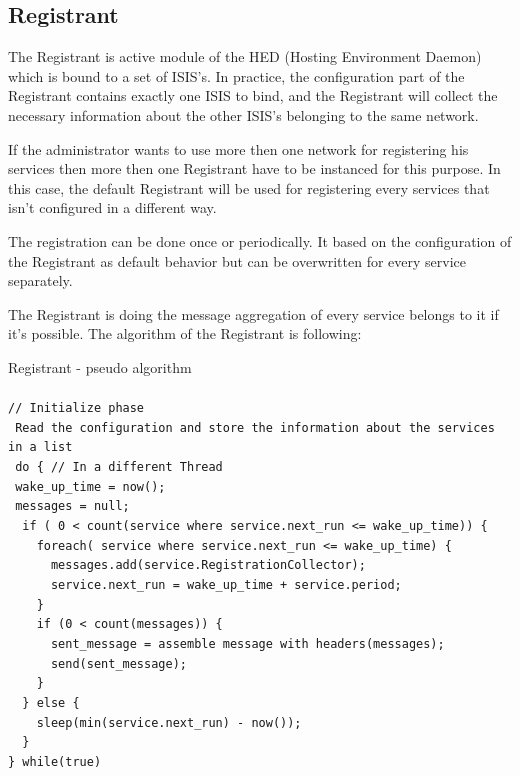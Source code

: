 \documentclass{article}                            %
\begin{document}
\subsection{Registrant}
\label{Registrant}
The Registrant is active module of the HED (Hosting Environment Daemon) which is bound to a set of ISIS's. In practice, the configuration part of the Registrant contains exactly one ISIS to bind, and the Registrant will collect the necessary information about the other ISIS's belonging to the same network.\par
If the administrator wants to use more then one network for registering his services then more then one Registrant have to be instanced for this purpose. In this case, the default Registrant will be used for registering every services that isn't configured in a different way. \par
The registration can be done once or periodically. It based on the configuration of the Registrant as default behavior but can be overwritten for every service separately.\par
The Registrant is doing the message aggregation of every service belongs to it if it's possible. The algorithm of the Registrant is following:
\begin{framed}
  Registrant - pseudo algorithm\\
  \\
  \verb#// Initialize phase#\\
  \verb# Read the configuration and store the information about the services in a list#\\
  \verb# do { // In a different Thread#\\
  \verb# wake_up_time = now();#\\
  \verb# messages = null;#\\
  \verb#  if ( 0 < count(service where service.next_run <= wake_up_time)) {#\\
  \verb#    foreach( service where service.next_run <= wake_up_time) {#\\
  \verb#      messages.add(service.RegistrationCollector);#\\
  \verb#      service.next_run = wake_up_time + service.period;#\\
  \verb#    }#\\
  \verb#    if (0 < count(messages)) {#\\
  \verb#      sent_message = assemble message with headers(messages);#\\
  \verb#      send(sent_message);#\\
  \verb#    }#\\
  \verb#  } else {#\\
  \verb#    sleep(min(service.next_run) - now()); #\\
  \verb#  }#\\
  \verb#} while(true)#\\
\end{framed}
\end{document}
